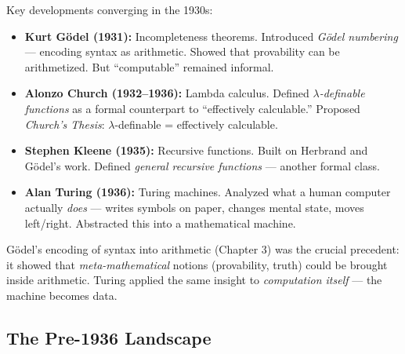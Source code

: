 Key developments converging in the 1930s:

\begin{itemize}
\item \textbf{Kurt G\"odel (1931):} Incompleteness theorems. Introduced \emph{G\"odel numbering} --- encoding syntax as arithmetic. Showed that provability can be arithmetized. But ``computable'' remained informal.

\item \textbf{Alonzo Church (1932--1936):} Lambda calculus. Defined \emph{$\lambda$-definable functions} as a formal counterpart to ``effectively calculable.'' Proposed \emph{Church's Thesis}: $\lambda$-definable = effectively calculable.

\item \textbf{Stephen Kleene (1935):} Recursive functions. Built on Herbrand and G\"odel's work. Defined \emph{general recursive functions} --- another formal class.

\item \textbf{Alan Turing (1936):} Turing machines. Analyzed what a human computer actually \emph{does} --- writes symbols on paper, changes mental state, moves left/right. Abstracted this into a mathematical machine.
\end{itemize}

G\"odel's encoding of syntax into arithmetic (Chapter 3) was the crucial precedent: it showed that \emph{meta-mathematical} notions (provability, truth) could be brought inside arithmetic. Turing applied the same insight to \emph{computation itself} --- the machine becomes data.

\subsection*{The Pre-1936 Landscape}

